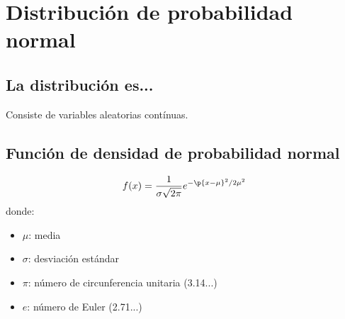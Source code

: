 \documentclass{article}
\begin{document}
\hrulefill
\section{Distribución de probabilidad normal}
\subsection{La distribución es...}
Consiste de variables aleatorias contínuas.

\subsection{Función de densidad de probabilidad normal}
\[
  f(x) = \frac{1}{\sigma \sqrt{2\pi}} e^{-\p{x-\mu}^2 / 2\mu^2 }
\] donde:
\begin{itemize}
    \item $\mu$: media 
    \item $\sigma$: desviación estándar 
    \item $\pi$: número de circunferencia unitaria (3.14...)
    \item $e$: número de Euler (2.71...)  
\end{itemize}
\end{document}
